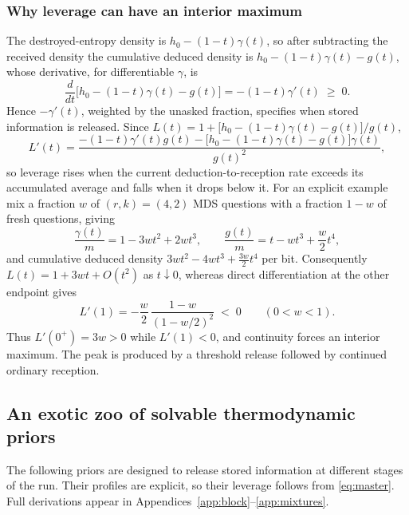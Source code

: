 \subsubsection{Why leverage can have an interior maximum}

The destroyed-entropy density is $h_0 - (1-t)\gamma(t)$, so after
subtracting the received density the cumulative deduced density is
$h_0 - (1-t)\gamma(t) - g(t)$, whose derivative, for differentiable
$\gamma$, is
%
\begin{equation}
  \frac{d}{dt}\Big[h_0-(1-t)\gamma(t)-g(t)\Big]
  = -(1-t)\gamma'(t) \;\ge\; 0 .
  \label{eq:deduceddensity}
\end{equation}
%
Hence $-\gamma'(t)$, weighted by the unasked fraction, specifies when
stored information is released. Since
$L(t) = 1 + \big[h_0-(1-t)\gamma(t)-g(t)\big]/g(t)$,
%
\begin{equation}
  L'(t)
  = \frac{-(1-t)\gamma'(t)g(t)
    - \big[h_0-(1-t)\gamma(t)-g(t)\big]\gamma(t)}{g(t)^2},
  \label{eq:Lprime}
\end{equation}
%
so leverage rises when the current deduction-to-reception rate
exceeds its accumulated average and falls when it drops below it. For
an explicit example mix a fraction $w$ of $(r,k) = (4,2)$ MDS
questions with a fraction $1-w$ of fresh questions, giving
%
\begin{equation}
  \frac{\gamma(t)}m = 1 - 3wt^2 + 2wt^3,
  \qquad
  \frac{g(t)}m = t - wt^3 + \frac w2 t^4,
  \label{eq:peakexample}
\end{equation}
%
and cumulative deduced density
$3wt^2 - 4wt^3 + \tfrac{3w}2 t^4$ per bit. Consequently
$L(t) = 1 + 3wt + O(t^2)$ as $t\downarrow0$, whereas direct
differentiation at the other endpoint gives
%
\begin{equation}
  L'(1) = -\frac w2\,\frac{1-w}{(1-w/2)^2} \;<\; 0
  \qquad (0 < w < 1).
  \label{eq:Lprimeone}
\end{equation}
%
Thus $L'(0^+) = 3w > 0$ while $L'(1) < 0$, and continuity forces an
interior maximum. The peak is produced by a threshold release
followed by continued ordinary reception.

\subsection{An exotic zoo of solvable thermodynamic
priors}\label{sec:zoo}

The following priors are designed to release stored information at
different stages of the run. Their profiles are explicit, so their
leverage follows from \eqref{eq:master}. Full derivations appear in
Appendices~\ref{app:block}--\ref{app:mixtures}.

